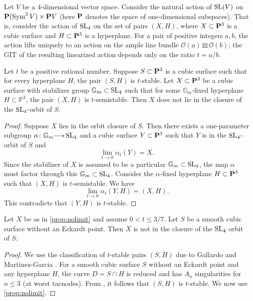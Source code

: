 \documentclass[12pt,reqno]{amsart}
\renewcommand{\to}{{\longrightarrow}}
\numberwithin{equation}{section}
\begin{document}
Let $V$ be a 4-dimensional vector space.
Consider the natural action of $\SL(V)$ on $\P(\Sym^3V) \times \P V$ (here $\P$ denotes the space of one-dimensional subspaces).
That is, consider the action of $\SL_4$ on the set of pairs $(X, H)$, where $X \subset \P^3$ is a cubic surface and $H \subset \P^3$ is a hyperplane.
For a pair of positive integers $a, b$, the action lifts uniquely to an action on the ample line bundle $\mathcal O(a)\boxtimes \mathcal O(b)$; the GIT of the resulting linearized action depends only on the ratio $t = a/b$.

\begin{proposition}\label{prop:nolimit}
  Let $t$ be a positive rational number.
  Suppose $S \subset \P^3$ is a cubic surface such that for every hyperplane $H$, the pair $(S,H)$ is $t$-stable.
  Let $X \subset \P^3$ be a cubic surface with stabilizer group $\mathbb G_m \subset \SL_4$ such that for some $\mathbb G_m$-fixed hyperplane $H \subset \mathbb P^3$, the pair $(X, H)$ is $t$-semistable.
  Then $X$ does not lie in the closure of the $\SL_4$-orbit of $S$.
\end{proposition}
\begin{proof}
  Suppose $X$ lies in the orbit closure of $S$.
  Then there exists a one-parameter subgroup $\alpha \colon \mathbb G_m \to \SL_4$ and a cubic surface $Y \subset \P^3$ such that $Y$ is in the $\SL_4$-orbit of $S$ and
  \[ \lim_{t \to 0} \alpha_t(Y) = X.\]
  Since the stabilizer of $X$ is assumed to be a particular $\mathbb G_m \subset \SL_4$, the map $\alpha$ must factor through this $\mathbb G_m \subset \SL_4$.
  Consider the $\alpha$-fixed hyperplane $H \subset \P^3$ such that $(X, H)$ is $t$-semistable.
  We have
  \[ \lim_{t \to 0} \alpha_t(Y, H) = (X, H).\]
  This contradicts that $(Y, H)$ is $t$-stable.
\end{proof}
\begin{corollary}\label{cor:nolimit}
  Let $X$ be as in \autoref{prop:nolimit} and assume $0 < t \leq 3/7$.
  Let $S$ be a smooth cubic surface without an Eckardt point.
  Then $X$ is not in the closure of the $\SL_4$ orbit of $S$.
\end{corollary}
\begin{proof}
  We use the classification of $t$-stable pairs $(S,H)$ due to Gallardo and Martinez-Garcia \cite{gal.mar:19}.
  For a smooth cubic surface $S$ without an Eckardt point and any hyperplane $H$, the curve $D = S \cap H$ is reduced and has $A_n$ singularities for $n \leq 3$ (at worst tacnodes).
  From \cite[Theorem~2]{gal.mar:19}, it follows that $(S, H)$ is $t$-stable.
  We now use \autoref{prop:nolimit}.
\end{proof}
\end{document}
